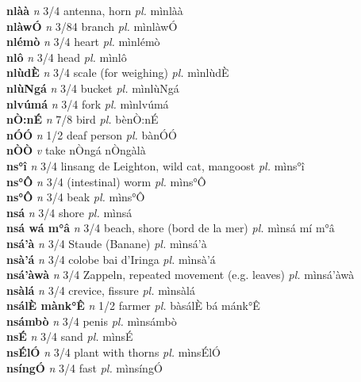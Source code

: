 \documentclass{article}
\begin{document}
{\bf nlàà}  {\it n} 3/4 antenna, horn {\it pl.} mìnlàà         \\ 
{\bf nlàwÓ}  {\it n} 3/84 branch {\it pl.} mìnlàwÓ         \\ 
{\bf nlémò}  {\it n} 3/4 heart {\it pl.} mìnlémò         \\ 
{\bf nlô}  {\it n} 3/4 head {\it pl.} mìnlô         \\ 
{\bf nlùdÈ}  {\it n} 3/4 scale (for weighing) {\it pl.} mìnlùdÈ         \\ 
{\bf nlùNgá}  {\it n} 3/4 bucket {\it pl.} mìnlùNgá         \\ 
{\bf nlvúmá}  {\it n} 3/4 fork {\it pl.} mìnlvúmá         \\ 
{\bf nÒ:nÉ}  {\it n} 7/8 bird {\it pl.} bènÒ:nÉ         \\ 
{\bf nÓÓ}  {\it n} 1/2 deaf person {\it pl.} bànÓÓ         \\ 
{\bf nÒÒ}  {\it v} take   nÒngá   nÒngàlà   \\ 
{\bf ns°î}  {\it n} 3/4 linsang de Leighton, wild cat, mangoost {\it pl.} mìns°î         \\ 
{\bf ns°Ô}  {\it n} 3/4 (intestinal) worm {\it pl.} mìns°Ô         \\ 
{\bf ns°Ô}  {\it n} 3/4 beak {\it pl.} mìns°Ô         \\ 
{\bf nsá}  {\it n} 3/4 shore {\it pl.} mìnsá         \\ 
{\bf nsá wá m°â}  {\it n} 3/4 beach, shore (bord de la mer) {\it pl.} mìnsá mí m°â         \\ 
{\bf nsá'à}  {\it n} 3/4 Staude (Banane) {\it pl.} mìnsá'à         \\ 
{\bf nsà'á}  {\it n} 3/4 colobe bai d'Iringa  {\it pl.} mìnsà'á         \\ 
{\bf nsá'àwà}  {\it n} 3/4 Zappeln, repeated movement (e.g. leaves) {\it pl.} mìnsá'àwà         \\ 
{\bf nsàlá}  {\it n} 3/4 crevice, fissure {\it pl.} mìnsàlá         \\ 
{\bf nsálÈ mànk°Ê}  {\it n} 1/2 farmer {\it pl.} bàsálÈ bá mánk°Ê         \\ 
{\bf nsámbò}  {\it n} 3/4 penis {\it pl.} mìnsámbò         \\ 
{\bf nsÉ}  {\it n} 3/4 sand {\it pl.} mìnsÉ         \\ 
{\bf nsÉlÓ}  {\it n} 3/4 plant with thorns {\it pl.} mìnsÉlÓ         \\ 
{\bf nsíngÓ}  {\it n} 3/4 fast {\it pl.} mìnsíngÓ         \\ 
\end{document}
